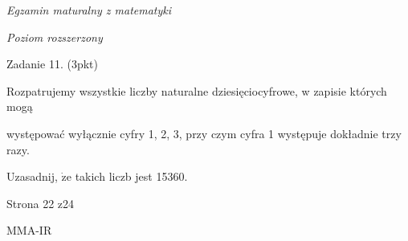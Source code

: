 \documentclass[a4paper,12pt]{article}
\begin{document}
{\it Egzamin maturalny z matematyki}

{\it Poziom rozszerzony}

Zadanie 11. (3pkt)

Rozpatrujemy wszystkie liczby naturalne dziesięciocyfrowe, w zapisie których mogą

występować wyłącznie cyfry 1, 2, 3, przy czym cyfra 1 występuje dokładnie trzy razy.

Uzasadnij, $\dot{\mathrm{z}}\mathrm{e}$ takich liczb jest 15360.

Strona 22 z24

MMA-IR
\end{document}
